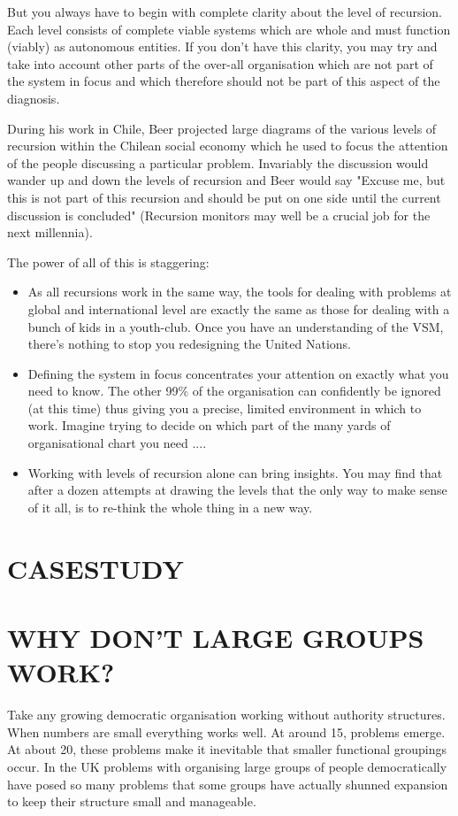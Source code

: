 But you always have to begin with complete clarity about the level of recursion. Each level consists of complete viable systems which are whole and must function (viably) as autonomous entities. If you don't have this clarity, you may try and take into account other parts of the over-all organisation which are not part of the system in focus and which therefore should not be part of this aspect of the diagnosis.

During his work in Chile, Beer projected large diagrams of the various levels of recursion within the Chilean social economy which he used to focus the attention of the people discussing a particular problem. Invariably the discussion would wander up and down the levels of recursion and Beer would say "Excuse me, but this is not part of this recursion and should be put on one side until the current discussion is concluded" (Recursion monitors may well be a crucial job for the next millennia).

The power of all of this is staggering:

\begin{itemize}
  \item As all recursions work in the same way, the tools for dealing with problems at global and international level are exactly the same as those for dealing with a bunch of kids in a youth-club. Once you have an understanding of the VSM, there's nothing to stop you redesigning the United Nations.

  \item Defining the system in focus concentrates your attention on exactly what you need to know. The other 99\% of the organisation can confidently be ignored (at this time) thus giving you a precise, limited environment in which to work. Imagine trying to decide on which part of the many yards of organisational chart you need ....

  \item Working with levels of recursion alone can bring insights. You may find that after a dozen attempts at drawing the levels that the only way to make sense of it all, is to re-think the whole thing in a new way.

\end{itemize}

\section*{CASESTUDY}

\section*{WHY DON'T LARGE GROUPS WORK?}
Take any growing democratic organisation working without authority structures. When numbers are small everything works well. At around 15, problems emerge. At about 20, these problems make it inevitable that smaller functional groupings occur. In the UK problems with organising large groups of people democratically have posed so many problems that some groups have actually shunned expansion to keep their structure small and manageable.


